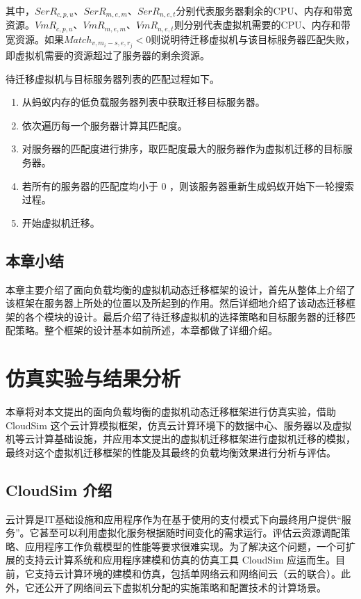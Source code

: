 其中，$ SerR_{c,p,u} $、$ SerR_{m,e,m} $、$ SerR_{n,e,t} $分别代表服务器剩余的CPU、内存和带宽资源。$ VmR_{c,p,u} $、$ VmR_{m,e,m} $、$ VmR_{n,e,t} $则分别代表虚拟机需要的CPU、内存和带宽资源。如果$ Match_{v,m_i - s,e,r_j} < 0 $则说明待迁移虚拟机与该目标服务器匹配失败，即虚拟机需要的资源超过了服务器的剩余资源。

待迁移虚拟机与目标服务器列表的匹配过程如下。
\begin{enumerate}[(1)]
    \item 从蚂蚁内存的低负载服务器列表中获取迁移目标服务器。
    \item 依次遍历每一个服务器计算其匹配度。
    \item 对服务器的匹配度进行排序，取匹配度最大的服务器作为虚拟机迁移的目标服务器。
    \item 若所有的服务器的匹配度均小于 0 ，则该服务器重新生成蚂蚁开始下一轮搜索过程。
    \item 开始虚拟机迁移。
\end{enumerate}

\section{本章小结}
本章主要介绍了面向负载均衡的虚拟机动态迁移框架的设计，首先从整体上介绍了该框架在服务器上所处的位置以及所起到的作用。然后详细地介绍了该动态迁移框架的各个模块的设计。最后介绍了待迁移虚拟机的选择策略和目标服务器的迁移匹配策略。整个框架的设计基本如前所述，本章都做了详细介绍。

\chapter{仿真实验与结果分析}
本章将对本文提出的面向负载均衡的虚拟机动态迁移框架进行仿真实验，借助 CloudSim 这个云计算模拟框架，仿真云计算环境下的数据中心、服务器以及虚拟机等云计算基础设施，并应用本文提出的虚拟机迁移框架进行虚拟机迁移的模拟，最终对这个虚拟机迁移框架的性能及其最终的负载均衡效果进行分析与评估。

\section{CloudSim 介绍}
云计算是IT基础设施和应用程序作为在基于使用的支付模式下向最终用户提供“服务”。它甚至可以利用虚拟化服务根据随时间变化的需求运行。评估云资源调配策略、应用程序工作负载模型的性能等要求很难实现。为了解决这个问题，一个可扩展的支持云计算系统和应用程序建模和仿真的仿真工具 CloudSim 应运而生\cite{Atanasov}。目前，它支持云计算环境的建模和仿真，包括单网络云和网络间云（云的联合）。此外，它还公开了网络间云下虚拟机分配的实施策略和配置技术的计算场景。

